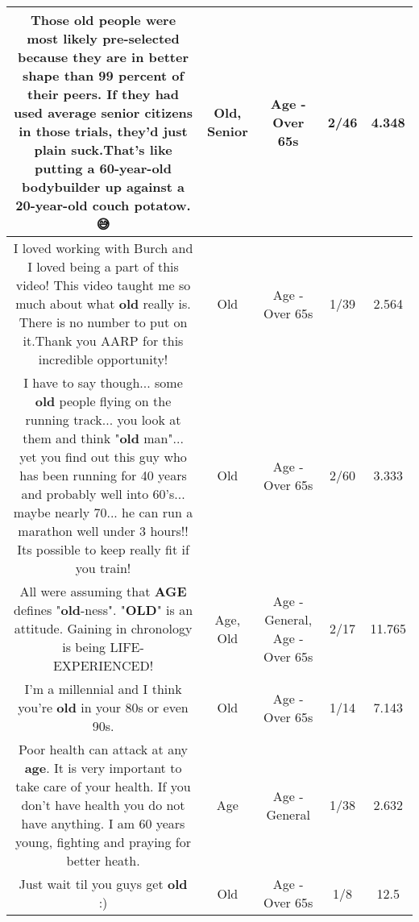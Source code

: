\documentclass[11pt]{article}
\newlength\mylength
\begin{document}
\begin{center}
\begin{longtable}{|C{.65\mylength}|C{.30\mylength}|C{.12\mylength}|C{.12\mylength}|C{.12\mylength}|}
  \small Those \textbf{old} people were most likely pre-selected because they are in better shape than 99 percent of their peers. If they had used average \textbf{senior} citizens in those trials, they'd just plain suck.That's like putting a 60-year-\textbf{old} bodybuilder up against a 20-year-\textbf{old} couch potatow. 😅\normalsize   & Old, Senior & Age - Over 65s & 2/46 & 4.348 \\  \hline
  \small I loved working with Burch and I loved being a part of this video! This video taught me so much about what \textbf{old} really is. There is no number to put on it.Thank you AARP for this incredible opportunity!\normalsize   & Old & Age - Over 65s & 1/39 & 2.564 \\  \hline
  \small I have to say though... some \textbf{old} people flying on the running track...  you look at them and think "\textbf{old} man"... yet you find out this guy who has been running for 40 years and probably well into 60's... maybe nearly 70... he can run a marathon well under 3 hours!!  Its possible to keep really fit if you train!\normalsize   & Old & Age - Over 65s & 2/60 & 3.333 \\  \hline
  \small All were assuming that \textbf{AGE} defines "\textbf{old}-ness". "\textbf{OLD}" is an attitude. Gaining in chronology is being LIFE-EXPERIENCED!\normalsize   & Age, Old & Age - General, Age - Over 65s & 2/17 & 11.765 \\  \hline
  \small I'm a millennial and I think you're \textbf{old} in your 80s or even 90s.\normalsize   & Old & Age - Over 65s & 1/14 & 7.143 \\  \hline
  \small Poor health can attack at any \textbf{age}. It is very important to take care of your health. If you don't have health you do not have anything. I am 60 years young, fighting and praying for better heath.\normalsize   & Age & Age - General & 1/38 & 2.632 \\  \hline
  \small Just wait til you guys get \textbf{old} :)\normalsize   & Old & Age - Over 65s & 1/8 & 12.5 \\  \hline

\end{longtable}
\end{center}
\end{document}
